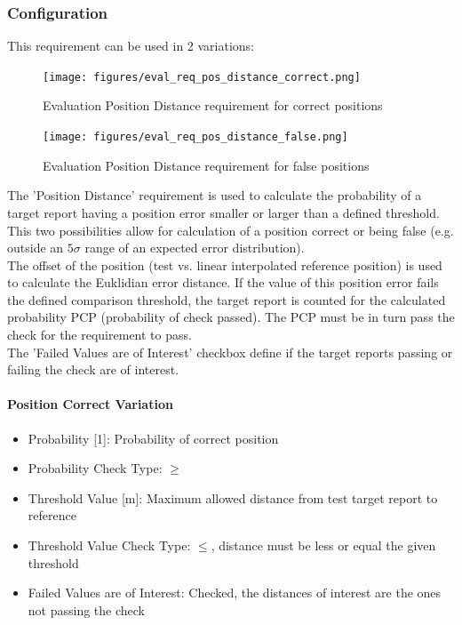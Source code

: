 \subsubsection{Configuration}

This requirement can be used in 2 variations:

\begin{figure}[H]
    \texttt{[image: figures/eval\_req\_pos\_distance\_correct.png]}
  \caption{Evaluation Position Distance requirement for correct positions}
\end{figure}

\begin{figure}[H]
    \texttt{[image: figures/eval\_req\_pos\_distance\_false.png]}
  \caption{Evaluation Position Distance requirement for false positions}
\end{figure}

The 'Position Distance' requirement is used to calculate the probability of a target report having a position error smaller or larger than a defined threshold. This two possibilities allow for calculation of a position correct or being false (e.g. outside an $5\sigma$ range of an expected error distribution). \\

The offset of the position (test vs. linear interpolated reference position) is used to calculate the Euklidian error distance. If the  value of this position error fails the defined comparison threshold, the target report is counted for the calculated probability PCP (probability of check passed). The PCP must be in turn pass the check for the requirement to pass. \\

The 'Failed Values are of Interest' checkbox define if the target reports passing or failing the check are of interest.


\paragraph{Position Correct Variation}

\begin{itemize}  
\item Probability [1]: Probability of correct position
\item Probability Check Type: $\geq$
\item Threshold Value [m]: Maximum allowed distance from test target report to reference
\item Threshold Value Check Type: $\leq$, distance must be less or equal the given threshold
\item Failed Values are of Interest: Checked, the distances of interest are the ones not passing the check
\end{itemize}
\ \\

